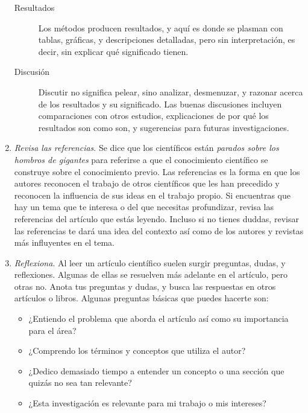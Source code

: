\begin{enumerate}
\begin{description}
          \item[Resultados] Los métodos producen resultados, y aquí es donde
                se plasman con tablas, gráficas, y descripciones detalladas,
                pero sin interpretación, es decir, sin explicar qué
                significado tienen.
          \item[Discusión] Discutir no significa pelear, sino analizar,
                desmenuzar, y razonar acerca de los resultados y su
                significado.
                Las buenas discusiones incluyen comparaciones con otros
                estudios, explicaciones de por qué los resultados son como
                son, y sugerencias para futuras investigaciones.
        \end{description}
  \item \emph{Revisa las referencias}. Se dice que los científicos están
        \emph{parados sobre los hombros de gigantes} para referirse a que el
        conocimiento científico se construye sobre el conocimiento previo.
        Las referencias es la forma en que los autores reconocen el trabajo de
        otros científicos que les han precedido y reconocen la influencia de
        sus ideas en el trabajo propio.
        Si encuentras que hay un tema que te interesa o del que necesitas
        profundizar, revisa las referencias del artículo que estás leyendo.
        Incluso si no tienes duddas, revisar las referencias te dará una idea
        del contexto así como de los autores y revistas más influyentes en el
        tema.
  \item \emph{Reflexiona}. Al leer un artículo científico suelen surgir
        preguntas, dudas, y reflexiones.
        Algunas de ellas se resuelven más adelante en el artículo, pero otras
        no.
        Anota tus preguntas y dudas, y busca las respuestas en otros artículos
        o libros.
        Algunas preguntas básicas que puedes hacerte son:
        \begin{itemize}
          \item ¿Entiendo el problema que aborda el artículo así como su
                importancia para el área?
          \item ¿Comprendo los términos y conceptos que utiliza el autor?
          \item ¿Dedico demasiado tiempo a entender un concepto o una
                sección que quizás no sea tan relevante?
          \item ¿Esta investigación es relevante para mi trabajo o mis
                intereses?

\end{itemize}
\end{enumerate}
